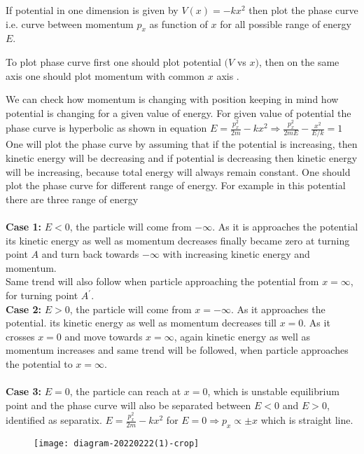 \begin{example}
 If potential in one dimension is given by $V(x)=-k x^{2}$ then plot the phase curve i.e. curve between momentum $p_{x}$ as function of $x$ for all possible range of energy $E$.
\end{example}
\begin{answer}
	To plot phase curve first one should plot potential $(V$ vs $x)$, then on the same axis one should plot momentum with common $x$ axis .
	
	We can check how momentum is changing with position keeping in mind how potential is changing for a given value of energy. For given value of potential the phase curve is hyperbolic as shown in equation $E=\frac{p_{x}^{2}}{2 m}-k x^{2} \Rightarrow \frac{p_{x}^{2}}{2 m E}-\frac{x^{2}}{E / k}=1$\\
	One will plot the phase curve by assuming that if the potential is increasing, then kinetic energy will be decreasing and if potential is decreasing then kinetic energy will be increasing, because total energy will always remain constant. One should plot the phase curve for different range of energy. For example in this potential there are three range of energy\\\\
	\textbf{Case 1:} $E<0$, the particle will come from $-\infty .$ As it is approaches the potential its kinetic energy as well as momentum decreases finally became zero at turning point $A$ and turn back towards $-\infty$ with increasing kinetic energy and momentum.\\
	Same trend will also follow when particle approaching the potential from $x=\infty$, for turning point $A^{\prime}$.\\
	\textbf{Case 2:} $E>0$, the particle will come from $x=-\infty$. As it approaches the potential. its kinetic energy as well as momentum decreases till $x=0$. As it crosses $x=0$ and move towards $x=\infty$, again kinetic energy as well as momentum increases and same trend will be followed, when particle approaches the potential to $x=\infty$.\\\\
	\textbf{Case 3:} $E=0$, the particle can reach at $x=0$, which is unstable equilibrium point and the phase curve will also be separated between $E<0$ and $E>0$, identified as separatix. $E=\frac{p_{x}^{2}}{2 m}-k x^{2}$ for $E=0 \Rightarrow p_{x} \propto \pm x$ which is straight line.\\
	\begin{figure}[H]
		\centering
		\texttt{[image: diagram-20220222(1)-crop]}
	\end{figure}
\end{answer}
